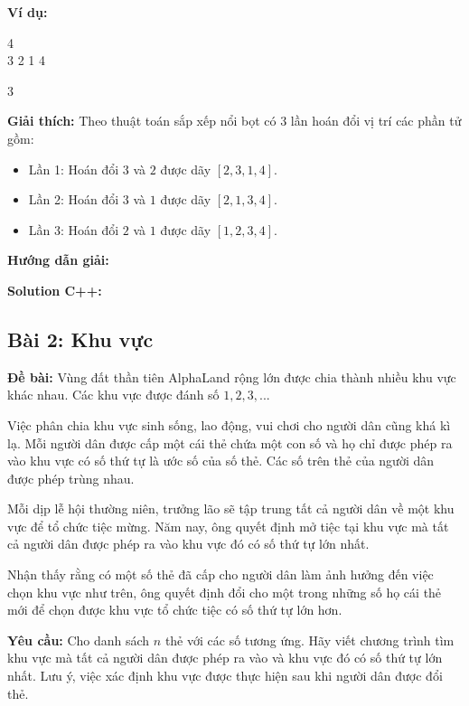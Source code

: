 \documentclass[12pt]{scrartcl}  %
\begin{document}
\textbf{Ví dụ:}
\begin{tcolorbox}[colback=gray!5!white, colframe=blue!50!black, title=Input]
4\\
3 2 1 4
\end{tcolorbox}

\begin{tcolorbox}[colback=gray!5!white, colframe=green!50!black, title=Output]
3
\end{tcolorbox}

\textbf{Giải thích:}
Theo thuật toán sắp xếp nổi bọt có $3$ lần hoán đổi vị trí các phần tử gồm: 
\begin{itemize}
    \item Lần 1: Hoán đổi $3$ và $2$ được dãy $\left[2, 3, 1, 4\right]$.
    \item Lần 2: Hoán đổi $3$ và $1$ được dãy $\left[2, 1, 3, 4\right]$.
    \item Lần 3: Hoán đổi $2$ và $1$ được dãy $\left[1, 2, 3, 4\right]$.
\end{itemize}

\textbf{Hướng dẫn giải:}

\textbf{Solution C++:}

\subsection{Bài 2: Khu vực}
\textbf{Đề bài:}
Vùng đất thần tiên AlphaLand rộng lớn được chia thành nhiều khu vực khác nhau. Các khu vực được đánh số $1, 2, 3, ...$ 

Việc phân chia khu vực sinh sống, lao động, vui chơi cho người dân cũng khá kì lạ. Mỗi người dân được cấp một cái thẻ chứa một con số và họ chỉ được phép ra vào khu vực có số thứ tự là ước số của số thẻ. Các số trên thẻ của người dân được phép trùng nhau.

Mỗi dịp lễ hội thường niên, trưởng lão sẽ tập trung tất cả người dân về một khu vực để tổ chức tiệc mừng. Năm nay, ông quyết định mở tiệc tại khu vực mà tất cả người dân được phép ra vào khu vực đó có số thứ tự lớn nhất. 

Nhận thấy rằng có một số thẻ đã cấp cho người dân làm ảnh hưởng đến việc chọn khu vực như trên, ông quyết định đổi cho một trong những số họ cái thẻ mới để chọn được khu vực tổ chức tiệc có số thứ tự lớn hơn.

\textbf{Yêu cầu:} Cho danh sách $n$ thẻ với các số tương ứng. Hãy viết chương trình tìm khu vực mà tất cả người dân được phép ra vào và khu vực đó có số thứ tự lớn nhất. Lưu ý, việc xác định khu vực được thực hiện sau khi người dân được đổi thẻ. 
\end{document}
